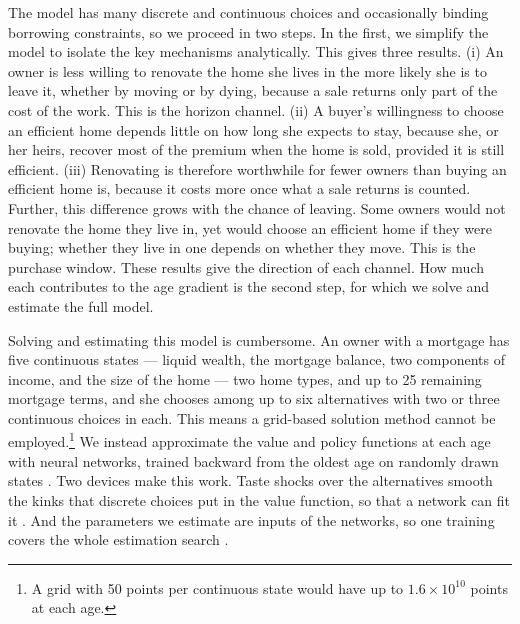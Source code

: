The model has many discrete and continuous choices
and occasionally binding borrowing constraints, so we
proceed in two steps. In the first, we simplify the model to
isolate the key mechanisms analytically. This gives three results. (i) An
owner is less willing to renovate the home she lives in the more likely
she is to leave it, whether by moving or by dying, because a sale
returns only part of the cost of the work. This is the horizon channel.
(ii) A buyer's willingness to choose an efficient home depends
little on how long she expects to stay, because she, or her heirs, recover
most of the premium when the home is sold, provided it is still
efficient. (iii) Renovating is therefore worthwhile for fewer owners than
buying an efficient home is, because it costs more once what a sale returns
is counted. Further, this difference grows with the chance of leaving. Some
owners would not renovate the home they live in, yet would choose an
efficient home if they were buying; whether they live in one depends on
whether they move. This is the purchase window. These results give the
direction of each channel. How much each contributes to the age gradient is
the second step, for which we solve and estimate the full model.


Solving and estimating this model is cumbersome. An owner with a
mortgage has five continuous states --- liquid wealth, the mortgage balance,
two components of income, and the size of the home --- two home types, and up
to 25 remaining mortgage terms, and she chooses among up to six alternatives
with two or three continuous choices in each. This means a grid-based solution method cannot be employed.\footnote{A grid with 50 points per
continuous state would have up to $1.6\times10^{10}$ points at each age.} We instead approximate the value and policy
functions at each age with neural networks, trained backward from the
oldest age on randomly drawn states
\citep{maliar2021deep,azinovic2022deep,druedahl2026deep}. Two devices make
this work. Taste shocks over the alternatives smooth the kinks that
discrete choices put in the value function, so that a network can fit it
\citep{iskhakov2017endogenous}. And the parameters we estimate are inputs of
the networks, so one training covers the whole estimation search
\citep{druedahl2026nonconvex}.


